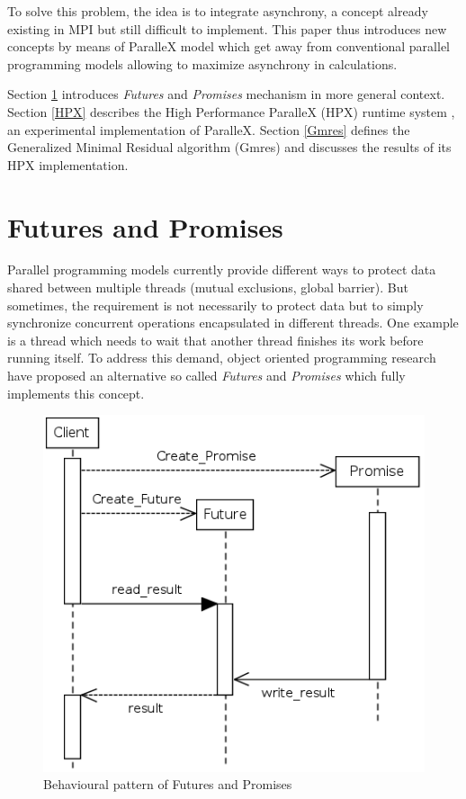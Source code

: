 \documentclass[smallextended]{svjour3}
\begin{document}
To solve this problem, the idea is to integrate asynchrony, a concept already existing in MPI but still difficult to implement. This paper thus introduces new concepts by means of ParalleX model which get away from conventional parallel programming models allowing to maximize asynchrony in calculations.\smallskip

Section \ref{Futures} introduces \emph{Futures} and \emph{Promises} mechanism in more general context. Section \ref{HPX} describes the High Performance ParalleX (HPX) runtime system \cite{ParalleX}, an experimental implementation of ParalleX. Section \ref{Gmres} defines the Generalized Minimal Residual algorithm (Gmres) \cite{GMRES} and discusses the results of its HPX implementation.

\section{Futures and Promises}\label{Futures}
Parallel programming models currently provide different ways to protect data shared between multiple threads (mutual exclusions, global barrier). But sometimes, the requirement is not necessarily to protect data but to simply synchronize concurrent operations encapsulated in different threads. One example is a thread which needs to wait that another thread finishes its work before running itself. To address this demand, object oriented programming research have proposed an alternative so called \emph{Futures} and \emph{Promises} \cite{Futures1} \cite{Futures2} which fully implements this concept.

\begin{figure}[h]
\begin{center}
\includegraphics[scale=0.5]{Images/Im1.png}
\end{center}
\caption{Behavioural pattern of Futures and Promises}
\label{thread}
\end{figure}
\end{document}
